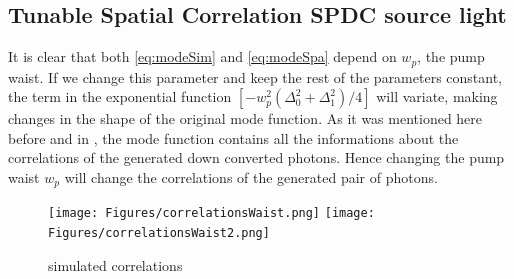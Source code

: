 \subsection{Tunable Spatial Correlation SPDC source light}
It is clear that both \ref{eq:modeSim} and \ref{eq:modeSpa} depend on $w_p$, the pump waist. If we change this 
parameter and keep the rest of the parameters constant, the term in the exponential function $[-w_p^2 (\Delta_0^2 + \Delta_1^2 )/4]$ will variate,
making changes in the shape of the original mode function. As it was mentioned here before and in \cite{omar}, the mode function
contains all the informations about the correlations of the generated down converted photons. Hence changing the pump waist $w_p$
will change the correlations of the generated pair of photons.

\begin{figure}[h!]
\centering
{  \texttt{[image: Figures/correlationsWaist.png]} }
{  \texttt{[image: Figures/correlationsWaist2.png]} }
\caption{simulated correlations }
 \label{fig:simCorrelations}
\end{figure}


